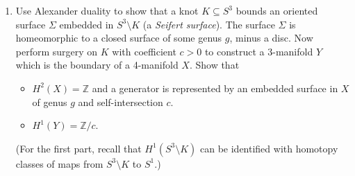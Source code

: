 \documentclass{article}
\theoremstyle{definition}
\newcommand{\Z}{\mathbb{Z}}
\begin{document}
\begin{enumerate}
    \item Use Alexander duality to show that a knot $K\subseteq S^3$ bounds an
        oriented surface $\Sigma$ embedded in $S^3\setminus K$ (a \emph{Seifert
        surface}). The surface $\Sigma$ is homeomorphic to a closed surface of
        some genus $g$, minus a disc. Now perform surgery on $K$ with
        coefficient $c>0$ to construct a 3-manifold $Y$ which is the boundary of
        a 4-manifold $X$. Show that
        \begin{itemize}
            \item $H^2(X)=\Z$ and a generator is represented by an embedded
                surface in $X$ of genus $g$ and self-intersection $c$.
            \item $H^1(Y)=\Z/c$.
        \end{itemize}
        (For the first part, recall that $H^1(S^3\setminus K)$ can be identified
        with homotopy classes of maps from $S^3\setminus K$ to $S^1$.)
\end{enumerate}
\end{document}

